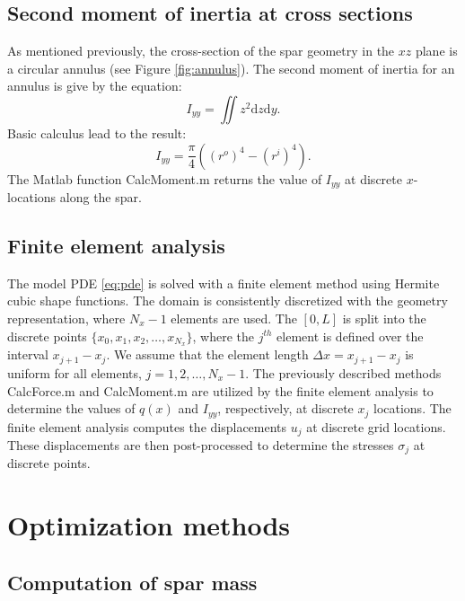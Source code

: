 \documentclass[11pt]{article}
\begin{document}
\subsection{Second moment of inertia at cross sections}

As mentioned previously, the cross-section of the spar
geometry in the $xz$ plane is a circular annulus
(see Figure \ref{fig:annulus}). The second moment
of inertia for an annulus is give by the equation:
\begin{equation}
I_{yy} = \iint z^2 \text{d} z \text{d} y.
\end{equation}
Basic calculus lead to the result:
\begin{equation}
I_{yy} = \frac{\pi}{4} \left ( (r^o)^4 - (r^i)^4 \right).
\end{equation}
The Matlab function CalcMoment.m returns the value
of $I_{yy}$ at discrete $x$-locations along the spar.

\subsection{Finite element analysis}

The model PDE \eqref{eq:pde} is solved with a finite
element method using Hermite cubic shape functions.
The domain is consistently discretized with the geometry
representation, where $N_x-1$ elements are used. The 
$[0,L]$ is split into the discrete points
$\{ x_0, x_1, x_2, \dots, x_{N_x} \}$, where the $j^{th}$
element is defined over the interval $x_{j+1} - x_j$.
We assume that the element length $\Delta x = x_{j+1} - x_j$
is uniform for all elements, $j=1,2,\dots,N_x-1$.
The previously described methods CalcForce.m and
CalcMoment.m are utilized by the finite element analysis
to determine the values of $q(x)$ and $I_{yy}$, respectively,
at discrete $x_j$ locations. The finite element analysis
computes the displacements $u_j$ at discrete grid locations.
These displacements are then post-processed to determine
the stresses $\sigma_j$ at discrete points.

\section{Optimization methods}

\subsection{Computation of spar mass}
\end{document}

